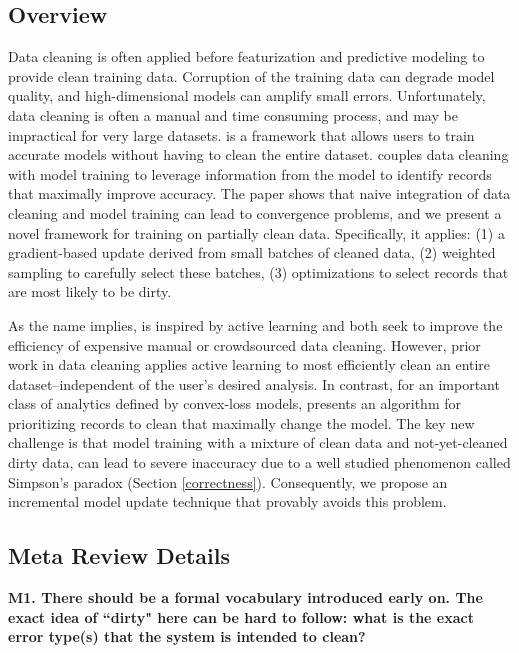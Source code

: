 \subsection*{Overview} 
Data cleaning is often applied before featurization and predictive modeling to provide clean training data.
Corruption of the training data can degrade model quality, and high-dimensional models can amplify small errors.
Unfortunately, data cleaning is often a manual and time consuming process, and may be impractical for very large datasets.
\sys is a framework that allows users to train accurate models without having to clean the entire dataset. 
\sys couples data cleaning with model training to leverage information from the model to identify records that maximally improve accuracy.
The paper shows that naive integration of data cleaning and model training can lead to convergence problems, and we present a novel framework for training on partially clean data.
Specifically, it applies: (1) a gradient-based update derived from small batches of cleaned data, (2) weighted sampling to carefully select these batches, (3) optimizations to select records that are most likely to be dirty.

As the name implies, \sys is inspired by active learning and both seek to improve the efficiency of expensive manual or crowdsourced data cleaning.
However, prior work in data cleaning applies active learning to most efficiently clean an entire dataset--independent of the user's desired analysis.
In contrast, for an important class of analytics defined by convex-loss models, \sys presents an algorithm for prioritizing records to clean that maximally change the model.
The key new challenge is that model training with a mixture of clean data and not-yet-cleaned dirty data, can lead to severe inaccuracy due to a well studied phenomenon called Simpson's paradox (Section \ref{correctness}).
Consequently, we propose an incremental model update technique that provably avoids this problem.

\vspace{0.5em}

\subsection*{Meta Review Details} 

\noindent\noindent \textbf{M1. There should be a formal vocabulary introduced early on. The exact idea of ``dirty" here can be hard to follow: what is the exact error type(s) that the system is intended to clean?}

